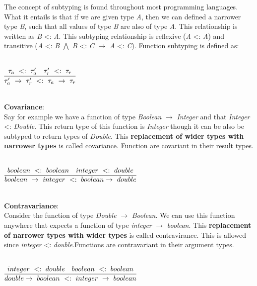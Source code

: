 \documentclass[9pt]{extarticle} %
\begin{document}
%
\begin{minipage}[t]{.61\linewidth} %
\vspace{-0.4cm}
\hypertarget{firstnews}{}

The concept of subtyping is found throughout most programming languages. What it
entails is that if we are given type \textit{A}, then we can defined a narrower
type \textit{B}, such that all values of type \textit{B} are also of type 
\textit{A}. This relationship is written as \textit{B} <: \textit{A}. 
This subtyping relationship is reflexive (\textit{A} <: \textit{A})  and transitive
(\textit{A} <: \textit{B} $\bigwedge$ \textit{B} <: \textit{C} $\rightarrow$
\textit{A} <: \textit{C}). Function subtyping is defined as: \\
\\
\centerline{$\infer{\tau'_a\ \rightarrow\ \tau'_r\ <:\ \tau_a\ \rightarrow\ \tau_r}
	   {\tau_a\ <:\ \tau'_a\ \ \ \tau'_r\ <:\ \tau_r}$}
\\
\textbf{Covariance}: \\
Say for example we have a function of type \textit{Boolean} $\rightarrow$
\textit{Integer} and that \textit{Integer} <: \textit{Double}. This return type
of this function is \textit{Integer} though it can be also be subtyped to return 
types of \textit{Double}. This \textbf{replacement of wider types with narrower
types} is called covariance. Function are covariant in their result types. \\
\\
\centerline{$\infer{boolean\ \rightarrow\ integer\ <:\ boolean \rightarrow\ double}
	   {boolean\ <:\ boolean\ \ \ integer\ <:\ double}$}
\\
\textbf{Contravariance}: \\
Consider the function of type \textit{Double} $\rightarrow$ \textit{Boolean}. We
can use this function anywhere that expects a function of type \textit{integer}
$\rightarrow$ \textit{boolean}. This \textbf{replacement of narrower types with 
wider types} is called contravirance. This is allowed since \textit{integer} <:
\textit{double}.Functions are contravariant in their argument types. \\
\\
\centerline{$\infer{double \rightarrow\ boolean\ <:\ integer\ \rightarrow\ boolean}
	   {integer\ <:\ double\ \ \ boolean\ <:\ boolean}$}
\\

\end{minipage}
\end{document}
